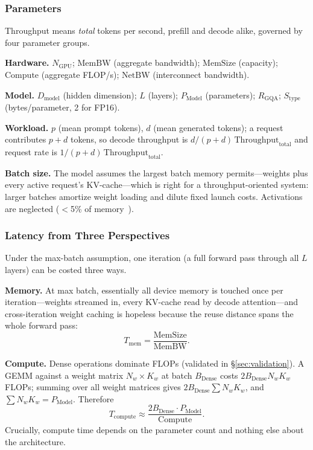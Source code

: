 \documentclass[manuscript,review]{acmart}
\newcommand{\Bdense}{B_{\mathrm{Dense}}}
\newcommand{\Pmodel}{P_{\mathrm{Model}}}
\newcommand{\Dmodel}{D_{\mathrm{model}}}
\newcommand{\membw}{\mathrm{MemBW}}
\newcommand{\memsize}{\mathrm{MemSize}}
\newcommand{\compute}{\mathrm{Compute}}
\newcommand{\netbw}{\mathrm{NetBW}}
\begin{document}
\subsubsection{Parameters}

Throughput means \emph{total} tokens per second, prefill and decode alike, governed by four parameter groups.

\textbf{Hardware.} $N_{\mathrm{GPU}}$; $\membw$ (aggregate bandwidth); $\memsize$ (capacity);
$\compute$ (aggregate FLOP/s); $\netbw$ (interconnect bandwidth).

\textbf{Model.} $\Dmodel$ (hidden dimension); $L$ (layers); $\Pmodel$ (parameters);
$R_{\mathrm{GQA}}$; $S_{\mathrm{type}}$ (bytes/parameter, 2 for FP16).

\textbf{Workload.} $p$ (mean prompt tokens), $d$ (mean generated tokens); a request
contributes $p+d$ tokens, so decode throughput is
$d/(p+d)\,\mathrm{Throughput}_{\mathrm{total}}$ and request rate is
$1/(p+d)\,\mathrm{Throughput}_{\mathrm{total}}$.

\textbf{Batch size.} The model assumes the largest batch memory permits---weights plus every active request's 
KV-cache---which is right for a throughput-oriented system: larger batches amortize weight loading and dilute 
fixed launch costs. Activations are neglected ($<$5\% of memory~\cite{kwon2023efficient}).

\subsubsection{Latency from Three Perspectives}

Under the max-batch assumption, one iteration (a full forward pass through all $L$ layers) can be costed three 
ways.

\textbf{Memory.} At max batch, essentially all device memory is touched once per iteration---weights streamed 
in, every KV-cache read by decode attention---and cross-iteration weight caching is hopeless because the reuse 
distance spans the whole forward pass:
\begin{equation}
  T_{\mathrm{mem}} = \frac{\memsize}{\membw}.
  \label{eq:tmem}
\end{equation}

\textbf{Compute.} Dense operations dominate FLOPs (validated in
\S\ref{sec:validation}). A GEMM against a weight matrix $N_w \times K_w$ at batch
$\Bdense$ costs $2\Bdense N_w K_w$ FLOPs; summing over all weight matrices gives
$2\Bdense \sum N_w K_w$, and $\sum N_w K_w = \Pmodel$. Therefore
\begin{equation}
  T_{\mathrm{compute}} \approx \frac{2 \Bdense \cdot \Pmodel}{\compute}.
  \label{eq:tcompute}
\end{equation}
Crucially, compute time depends on the parameter count and nothing else about the
architecture.
\end{document}
